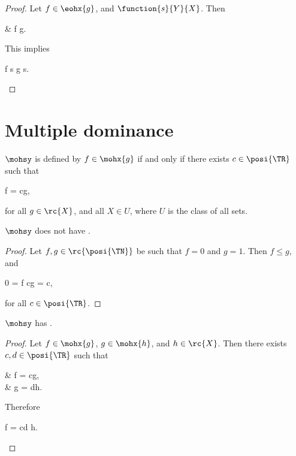 \documentclass[b5paper, english, oneside]{memoir}
\begin{document}
\begin{proof}
Let $f \in \eohx{g}$, and $\function{s}{Y}{X}$. Then
\begin{eqs}
{} & f \leq g.
\end{eqs}
This implies
\begin{eqs}
f \circ s \leq g \circ s.
\end{eqs}
\end{proof}

\section{Multiple dominance}
\label{MultipleDominance}

\begin{definition}
 $\mohsy$ is defined by $f \in \mohx{g}$ if and only if there exists $c \in \posi{\TR}$ such that
\begin{eqs}
f = cg,
\end{eqs}
for all $g \in \rc{X}$, and all $X \in U$, where $U$ is the class of all sets.
\end{definition}

\begin{theorem}
\label{MultipleOrderFails}
$\mohsy$ does not have .
\end{theorem}

\begin{proof}
Let $f, g \in \rc{\posi{\TN}}$ be such that $f = 0$ and $g = 1$. Then $f \leq g$, and
\begin{eqs}
0 = f \neq cg = c,
\end{eqs}
for all $c \in \posi{\TR}$.
\end{proof}

\begin{theorem}
\label{MultipleTransivity}
$\mohsy$ has .
\end{theorem}

\begin{proof}
Let $f \in \mohx{g}$, $g \in \mohx{h}$, and $h \in \rc{X}$. Then there exists $c, d \in \posi{\TR}$ such that
\begin{eqs}
{} & f = cg, \\
{} & g = dh.
\end{eqs}
Therefore
\begin{eqs}
f = cd h.
\end{eqs}
\end{proof}
\end{document}
